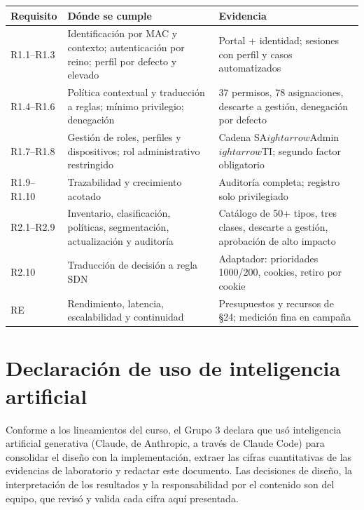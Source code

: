 \documentclass[11pt,a4paper]{article}
\begin{document}
\begin{longtable}{p{2.4cm}p{6.0cm}p{5.6cm}}
\toprule
\textbf{Requisito} & \textbf{Dónde se cumple} & \textbf{Evidencia}\\
\midrule
R1.1--R1.3 & Identificación por MAC y contexto; autenticación por reino; perfil por defecto y elevado & Portal + identidad; sesiones con perfil y casos automatizados\\
R1.4--R1.6 & Política contextual y traducción a reglas; mínimo privilegio; denegación & 37 permisos, 78 asignaciones, descarte a gestión, denegación por defecto\\
R1.7--R1.8 & Gestión de roles, perfiles y dispositivos; rol administrativo restringido & Cadena SA$
ightarrow$Admin$
ightarrow$TI; segundo factor obligatorio\\
R1.9--R1.10 & Trazabilidad y crecimiento acotado & Auditoría completa; registro solo privilegiado\\
R2.1--R2.9 & Inventario, clasificación, políticas, segmentación, actualización y auditoría & Catálogo de 50+ tipos, tres clases, descarte a gestión, aprobación de alto impacto\\
R2.10 & Traducción de decisión a regla SDN & Adaptador: prioridades 1000/200, cookies, retiro por cookie\\
RE & Rendimiento, latencia, escalabilidad y continuidad & Presupuestos y recursos de §24; medición fina en campaña\\
\bottomrule
\end{longtable}

\section{Declaración de uso de inteligencia artificial}
Conforme a los lineamientos del curso, el Grupo 3 declara que usó inteligencia artificial generativa (Claude, de Anthropic, a través de Claude Code) para consolidar el diseño con la implementación, extraer las cifras cuantitativas de las evidencias de laboratorio y redactar este documento. Las decisiones de diseño, la interpretación de los resultados y la responsabilidad por el contenido son del equipo, que revisó y valida cada cifra aquí presentada.
\end{document}
